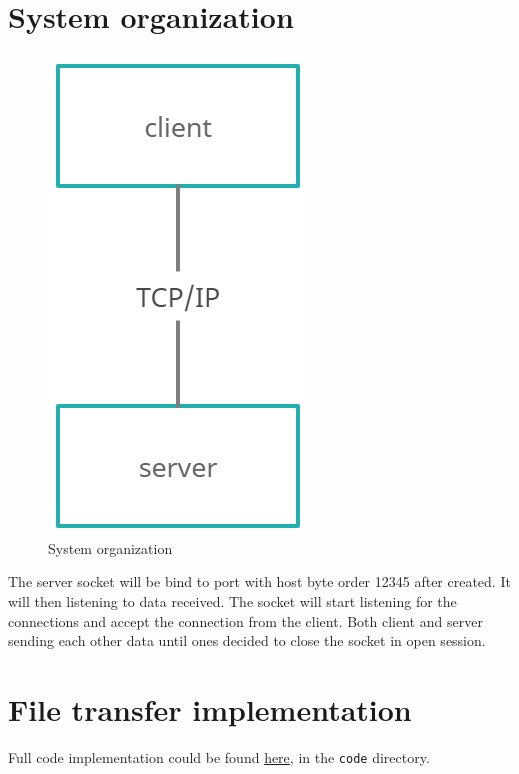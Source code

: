 \documentclass[times, 10pt]{thesisMDH}
\begin{document}
\section{System organization}
\begin{figure}[H]
    \centering
    \includegraphics[width = 0.2\linewidth]{images/1-2.png}
    \caption{System organization}
\end{figure}
The server socket will be bind to port with host byte order 12345 after created. It will then listening to data received. The socket will start listening for the connections and accept the connection from the client. Both client and server sending each other data until ones decided to close the socket in open session.
\section{File transfer implementation}
Full code implementation could be found \href{https://github.com/npthao1312/ds2021/tree/master/labwork1/code}{here}, in the \texttt{code} directory.
\end{document}
